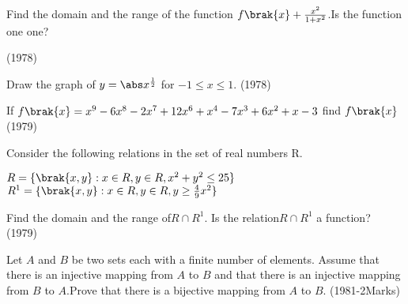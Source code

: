 
\iffalse
  \title{FUNCTIONS}
  \author{SRUJANA-EE24BTECH11042}
  \section{subjective}
\fi
\item Find the domain and the range of the function $f\brak{x}+\frac{x^2}{1+x^2}$.Is the function one one? 

\hfill(1978)
\item Draw the graph of $y=\abs x^{\frac{1}{2}}$ for $-1\le x \le1.$
\hfill(1978)
\item If $f\brak{x}=x^9-6x^8-2x^7+12x^6+x^4-7x^3+6x^2+x-3$ find $f\brak{x}$
\hfill(1979)
\item Consider the following relations in the set of real numbers R.

$R=\{\brak{x,y}:x\in R,y\in R,x^2+y^2\le25\}$
$R^1=\{\brak{x,y}:x\in R,y\in R,y\ge\frac{4}{9}x^2\}$

Find the domain and the range of$ R\cap R^1.$ Is the relation$ R\cap R^1$ a function? 
\hfill(1979)
\item Let $A$ and $B$ be two sets each with a finite number of elements. Assume that there is an injective mapping from $A$ to $B$ and that there is an injective mapping from $B$ to $A$.Prove that there is a bijective mapping from $A$ to $B$.
\hfill(1981-2Marks)
